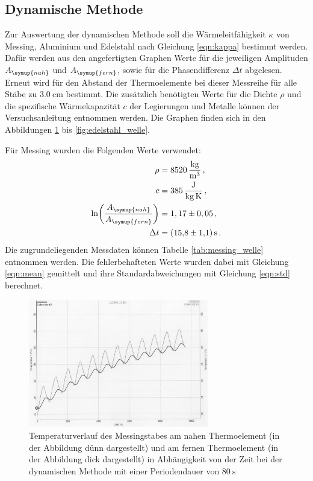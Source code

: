 \subsection{Dynamische Methode}
\label{sec:auswertung_dynamisch}

Zur Auswertung der dynamischen Methode soll die Wärmeleitfähigkeit $\kappa$ von
Messing, Aluminium und Edelstahl nach Gleichung \eqref{eqn:kappa} bestimmt werden.
Dafür werden aus den angefertigten Graphen Werte für die jeweiligen Amplituden
$A_{\symup{nah}}$ und $A_{\symup{fern}}$, sowie für die Phasendifferenz $\Delta t$ abgelesen. Erneut wird für den Abstand der
Thermoelemente bei dieser Messreihe für alle Stäbe zu $\SI{3.0}{\centi\meter}$ bestimmt.
Die zusätzlich benötigten Werte für die Dichte $\rho$ und die spezifische Wärmekapazität $c$
der Legierungen und Metalle können der Versuchsanleitung entnommen werden. Die Graphen
finden sich in den Abbildungen \ref{fig:messing_welle} bis \ref{fig:edelstahl_welle}.

Für Messing wurden die Folgenden Werte verwendet:
\begin{align}
  \rho &= \SI{8520}{\kilo\gram\per\cubic\meter}\,, \nonumber\\
  c &= \SI{385}{\joule\per\kilo\gram\per\kelvin}\,, \nonumber\\
  \ln\biggl(\frac{A_{\symup{nah}}}{A_{\symup{fern}}}\biggr) &= 1,17 \pm 0,05 \,, \nonumber\\
  \Delta t &= \SI{15.8(11)}{\second} \,. \nonumber
\end{align}
Die zugrundeliegenden Messdaten können Tabelle \ref{tab:messing_welle} entnommen
werden. Die fehlerbehafteten Werte wurden dabei mit Gleichung \eqref{eqn:mean} gemittelt
und ihre Standardabweichungen mit Gleichung \eqref{eqn:std} berechnet.

\begin{figure}
  \centering
  \includegraphics[width=0.7\textwidth]{data/t1undt2_welle.JPEG}
  \caption{Temperaturverlauf des Messingstabes am nahen Thermoelement (in der Abbildung dünn dargestellt)
  und am fernen Thermoelement (in der Abbildung dick dargestellt) in Abhängigkeit von der Zeit bei der
  dynamischen Methode mit einer Periodendauer von $\SI{80}{\second}$}
  \label{fig:messing_welle}
\end{figure}

